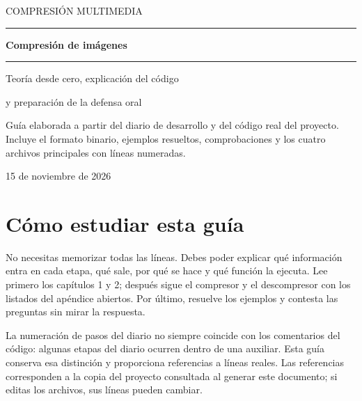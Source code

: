 \documentclass[11pt,a4paper,oneside]{report}
\begin{document}
\begin{titlepage}
\vspace*{12mm}
{\large COMPRESIÓN MULTIMEDIA\par}
\vspace{4mm}{\large Práctica 4 · Ejercicio 2\par}
\vspace{17mm}\hrule\vspace{9mm}
{\Huge\bfseries Compresión de imágenes\par}
\vspace{3mm}{\huge con Huffman a medida\par}
\vspace{9mm}\hrule
{}
\vspace{10mm}
{\large Teoría desde cero, explicación del código\par
y preparación de la defensa oral\par}
\vfill
\begin{minipage}{0.9\textwidth}
Guía elaborada a partir del diario de desarrollo y del código
real del proyecto. Incluye el formato binario, ejemplos resueltos,
comprobaciones y los cuatro archivos principales con líneas numeradas.
\end{minipage}
\vspace{13mm}\par
15 de noviembre de 2026
\end{titlepage}
\chapter*{Cómo estudiar esta guía}
No necesitas memorizar todas las líneas. Debes poder explicar qué información
entra en cada etapa, qué sale, por qué se hace y qué función la ejecuta.
Lee primero los capítulos 1 y 2; después sigue el compresor y el descompresor
con los listados del apéndice abiertos. Por último, resuelve los ejemplos y
contesta las preguntas sin mirar la respuesta.

La numeración de pasos del diario no siempre coincide con los comentarios
del código: algunas etapas del diario ocurren dentro de una auxiliar.
Esta guía conserva esa distinción y proporciona referencias a líneas reales.
Las referencias corresponden a la copia del proyecto consultada al generar
este documento; si editas los archivos, sus líneas pueden cambiar.
\end{document}
